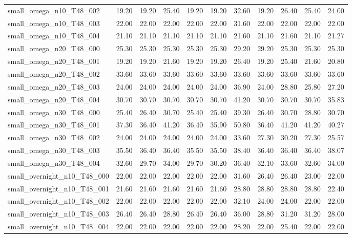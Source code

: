 \begin{table}[htbp]
\begin{tabular}{lrrrrrrrrrr}
small\_omega\_n10\_T48\_002 & 19.20 & 19.20 & 25.40 & 19.20 & 19.20 & 32.60 & 19.20 & 26.40 & 25.40 & 24.00 \\
small\_omega\_n10\_T48\_003 & 22.00 & 22.00 & 22.00 & 22.00 & 22.00 & 31.60 & 22.00 & 22.00 & 22.00 & 22.00 \\
small\_omega\_n10\_T48\_004 & 21.10 & 21.10 & 21.10 & 21.10 & 21.10 & 21.60 & 21.10 & 21.60 & 21.10 & 21.27 \\
small\_omega\_n20\_T48\_000 & 25.30 & 25.30 & 25.30 & 25.30 & 25.30 & 29.20 & 29.20 & 25.30 & 25.30 & 25.30 \\
small\_omega\_n20\_T48\_001 & 19.20 & 19.20 & 21.60 & 19.20 & 19.20 & 26.40 & 19.20 & 25.40 & 21.60 & 20.80 \\
small\_omega\_n20\_T48\_002 & 33.60 & 33.60 & 33.60 & 33.60 & 33.60 & 33.60 & 33.60 & 33.60 & 33.60 & 33.60 \\
small\_omega\_n20\_T48\_003 & 24.00 & 24.00 & 24.00 & 24.00 & 24.00 & 36.90 & 24.00 & 28.80 & 25.80 & 27.20 \\
small\_omega\_n20\_T48\_004 & 30.70 & 30.70 & 30.70 & 30.70 & 30.70 & 41.20 & 30.70 & 30.70 & 30.70 & 35.83 \\
small\_omega\_n30\_T48\_000 & 25.40 & 26.40 & 30.70 & 25.40 & 25.40 & 39.30 & 26.40 & 30.70 & 28.80 & 30.70 \\
small\_omega\_n30\_T48\_001 & 37.30 & 36.40 & 41.20 & 36.40 & 35.90 & 50.80 & 36.40 & 41.20 & 41.20 & 40.27 \\
small\_omega\_n30\_T48\_002 & 24.00 & 24.00 & 24.00 & 24.00 & 24.00 & 33.60 & 27.30 & 30.20 & 27.30 & 25.57 \\
small\_omega\_n30\_T48\_003 & 35.50 & 36.40 & 36.40 & 35.50 & 35.50 & 38.40 & 36.40 & 36.40 & 36.40 & 38.07 \\
small\_omega\_n30\_T48\_004 & 32.60 & 29.70 & 34.00 & 29.70 & 30.20 & 36.40 & 32.10 & 33.60 & 32.60 & 34.00 \\
small\_overnight\_n10\_T48\_000 & 22.00 & 22.00 & 22.00 & 22.00 & 22.00 & 31.60 & 26.40 & 26.40 & 23.00 & 22.00 \\
small\_overnight\_n10\_T48\_001 & 21.60 & 21.60 & 21.60 & 21.60 & 21.60 & 28.80 & 28.80 & 28.80 & 28.80 & 22.40 \\
small\_overnight\_n10\_T48\_002 & 22.00 & 22.00 & 22.00 & 22.00 & 22.00 & 32.10 & 24.00 & 24.00 & 22.00 & 22.00 \\
small\_overnight\_n10\_T48\_003 & 26.40 & 26.40 & 28.80 & 26.40 & 26.40 & 36.00 & 28.80 & 31.20 & 31.20 & 28.00 \\
small\_overnight\_n10\_T48\_004 & 22.00 & 22.00 & 22.00 & 22.00 & 22.00 & 28.20 & 22.00 & 25.40 & 22.00 & 22.00 \\

\end{tabular}
\end{table}
